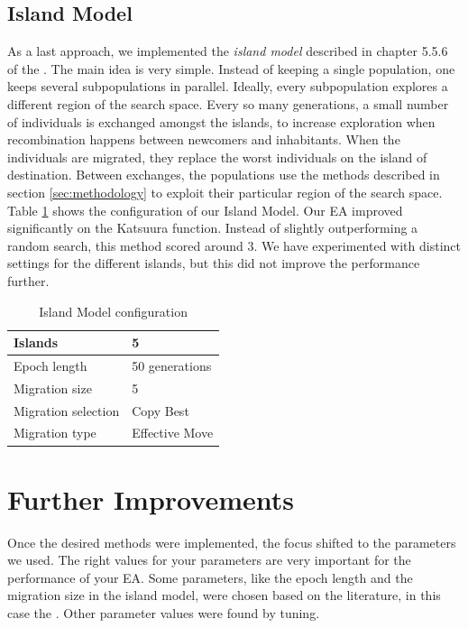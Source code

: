 \subsection{Island Model}
As a last approach, we implemented the \emph{island model} described in chapter 5.5.6 of the \book.
The main idea is very simple. Instead of keeping a single population, one keeps several
subpopulations in parallel. Ideally, every subpopulation explores a different region of the search
space. Every so many generations, a small number of individuals is exchanged amongst the islands,
to increase exploration when recombination happens between newcomers and inhabitants. When the
individuals
are migrated, they replace the worst individuals on the island of destination. Between
exchanges, the populations use the methods described in section \ref{sec:methodology} to exploit
their particular region of the search space. Table
\ref{tab:island-configuration} shows the configuration of our Island Model. Our EA improved
significantly on the Katsuura function. Instead of slightly outperforming a random search, this
method scored around $3$. We have experimented
with distinct settings for the different islands, but this did not improve the
performance further.
\begin{table}[t]
    \centering
    \begin{tabular}{|l|l|}
        \hline
        Islands & 5\\
        \hline
        Epoch length & 50 generations\\
        \hline
        Migration size & 5\\
        \hline
        Migration selection & Copy Best\\
        \hline
        Migration type & Effective Move\\
        \hline
    \end{tabular}
    \caption{Island Model configuration}\label{tab:island-configuration}
\end{table}


\section{Further Improvements}\label{sec:further-improvements}
Once the desired methods were implemented, the focus shifted to the parameters we used. The right
values for your parameters are very important for the performance of your EA. Some parameters, like
the epoch length and the migration size in the island model, were chosen based on the literature,
in this case the \book. Other parameter values were found by tuning.

